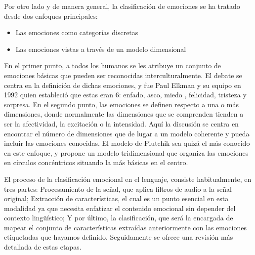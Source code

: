 \documentclass[11pt,a4paper,spanish]{book}
\begin{document}
	Por otro lado y de manera general, la clasificación de emociones se ha tratado desde dos enfoques principales:
	\begin{itemize}
		\item Las emociones como categorías discretas
		\item Las emociones vistas a través de un modelo dimensional
	\end{itemize}
	En el primer punto, a todos los humanos se les atribuye un conjunto de emociones básicas que pueden ser reconocidas interculturalmente. El debate se centra en la definición de dichas emociones, y fue Paul Elkman y su equipo en 1992 \cite{Ekman1992} quien estableció que estas eran 6: enfado, asco, miedo , felicidad, tristeza y sorpresa.
	En el segundo punto, las emociones se definen respecto a una o más dimensiones, donde normalmente las dimensiones que se comprenden tienden a ser la afectividad, la excitación o la intensidad. Aquí la discusión se centra en encontrar el número de dimensiones que de lugar a un modelo coherente y pueda incluir las emociones conocidas. El modelo de Plutchik \cite{Plutchik2001} sea quizá el más conocido en este enfoque, y propone un modelo tridimensional que organiza las emociones en círculos concéntricos situando la más básicas en el centro. \hfill \break
	
	El proceso de la clasificación emocional en el lenguaje, consiste habitualmente, en tres partes: Procesamiento de la señal, que aplica filtros de audio a la señal original; Extracción de características, el cual es un punto esencial en esta modalidad ya que necesita enfatizar el contenido emocional sin depender del contexto lingüístico; Y por último, la clasificación, que será la encargada de mapear el conjunto de características extraídas anteriormente con las emociones etiquetadas que hayamos definido. Seguidamente se ofrece una revisión más detallada de estas etapas.
		
\end{document}
